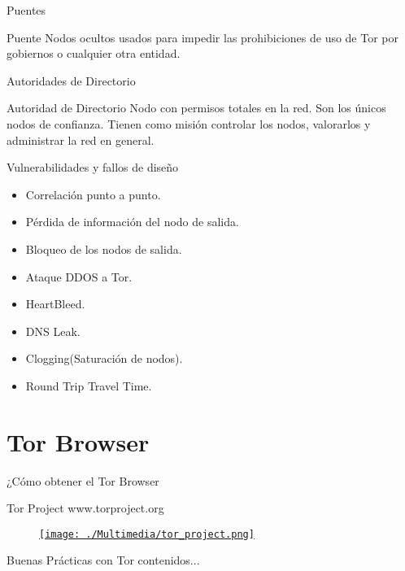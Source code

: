 \documentclass[10pt]{beamer}
\begin{document}
\begin{frame}[fragile]{Puentes}
	\pause
	\begin{block}{Puente}
		Nodos ocultos usados para impedir las prohibiciones de uso de Tor por gobiernos o cualquier otra entidad.
	\end{block}
\end{frame}

\begin{frame}[fragile]{Autoridades de Directorio}
	\pause
	\begin{block}{Autoridad de Directorio}
		Nodo con permisos totales en la red. Son los únicos nodos de confianza. Tienen como misión controlar los nodos, valorarlos y administrar la red en general.
	\end{block}
\end{frame}

\begin{frame}[fragile]{Vulnerabilidades y fallos de diseño}
	\pause
	\begin{itemize}
		\item<1-> Correlación punto a punto.\pause
		\item<2-> Pérdida de información del nodo de salida.\pause
		\item<3-> Bloqueo de los nodos de salida.\pause
		\item<4-> Ataque DDOS a Tor.\pause
		\item<5-> HeartBleed.\pause
		\item<6-> DNS Leak.\pause
		\item<7-> Clogging(Saturación de nodos).\pause
		\item<8-> Round Trip Travel Time.\pause
	\end{itemize}
\end{frame}

\section{Tor Browser}

\begin{frame}{¿Cómo obtener el Tor Browser}
	\pause
	\begin{block}{Tor Project}
		www.torproject.org
	\end{block}
	
	\begin{figure}
		\centering
		\href{http://www.torproject.org}{\texttt{[image: ./Multimedia/tor\_project.png]}}
	\end{figure}
	
	
\end{frame}

\begin{frame}{Buenas Prácticas con Tor}
	contenidos...
\end{frame}
	
\end{document}
